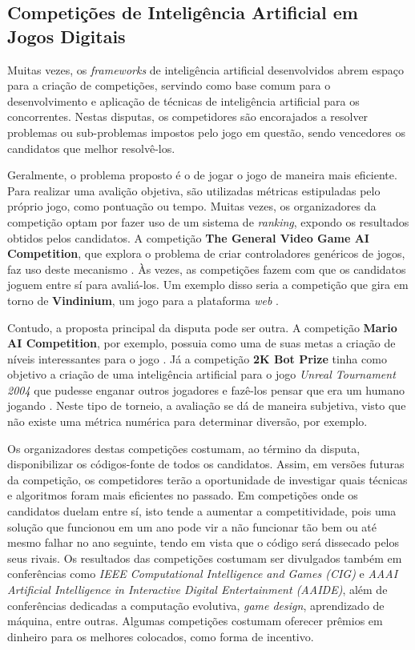 \subsection{Competições de Inteligência Artificial em Jogos Digitais}
Muitas vezes, os \textit{frameworks} de inteligência artificial desenvolvidos
abrem espaço para a criação de competições, servindo como base comum para o
desenvolvimento e aplicação de técnicas de inteligência artificial para os
concorrentes. Nestas disputas, os competidores são encorajados a resolver
problemas ou sub-problemas impostos pelo jogo em questão, sendo vencedores os
candidatos que melhor resolvê-los.

Geralmente, o problema proposto é o de jogar o jogo de maneira mais eficiente.
Para realizar uma avalição objetiva, são utilizadas métricas estipuladas pelo
próprio jogo, como pontuação ou tempo. Muitas vezes, os organizadores da
competição optam por fazer uso de um sistema de \textit{ranking}, expondo os
resultados obtidos pelos candidatos. A competição \textbf{The General Video Game
AI Competition}, que explora o problema de criar controladores genéricos de
jogos, faz uso deste mecanismo \cite{GVGAIWEB}.  Às vezes, as competições fazem
com que os candidatos joguem entre sí para avaliá-los.  Um exemplo disso seria a
competição que gira em torno de \textbf{Vindinium}, um jogo para a plataforma
\textit{web} \cite{VINDINIUMWEB}.

Contudo, a proposta principal da disputa pode ser outra. A competição
\textbf{Mario AI Competition}, por exemplo, possuia como uma de suas metas a
criação de níveis interessantes para o jogo \cite{MARIOAIWEB}. Já a competição
\textbf{2K Bot Prize} tinha como objetivo a criação de uma inteligência
artificial para o jogo \textit{Unreal Tournament 2004} que pudesse enganar
outros jogadores e fazê-los pensar que era um humano jogando
\cite{UNREALAIWEB}. Neste tipo de torneio, a avaliação se dá de maneira
subjetiva, visto que não existe uma métrica numérica para determinar diversão,
por exemplo.

Os organizadores destas competições costumam, ao término da disputa,
disponibilizar os códigos-fonte de todos os candidatos. Assim, em versões
futuras da competição, os competidores terão a oportunidade de investigar quais
técnicas e algoritmos foram mais eficientes no passado. Em competições onde os
candidatos duelam entre sí, isto tende a aumentar a competitividade, pois uma
solução que funcionou em um ano pode vir a não funcionar tão bem ou até mesmo
falhar no ano seguinte, tendo em vista que o código será dissecado pelos seus
rivais. Os resultados das competições costumam ser divulgados também em
conferências como \textit{IEEE Computational Intelligence and Games (CIG)} e
\textit{AAAI Artificial Intelligence in Interactive Digital Entertainment
(AAIDE)}, além de conferências dedicadas a computação evolutiva, \textit{game
design}, aprendizado de máquina, entre outras. Algumas competições costumam
oferecer prêmios em dinheiro para os melhores colocados, como forma de
incentivo.


